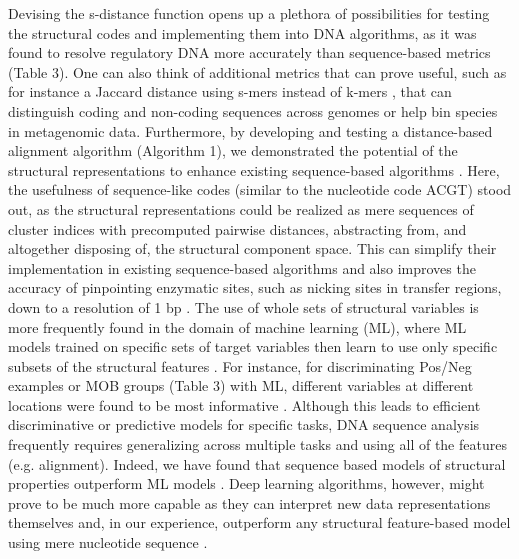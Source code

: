 \documentclass[sigconf]{acmart}
\begin{document}
Devising the s-distance function opens up a plethora of possibilities for testing the structural codes and implementing them into DNA algorithms, as it was found to resolve regulatory DNA more accurately than sequence-based metrics \cite{Zrimec2020-wx,Zrimec2018-lx} (Table 3). One can also think of additional metrics that can prove useful, such as for instance a Jaccard distance using s-mers instead of k-mers \cite{Zrimec2020-wx}, that can distinguish coding and non-coding sequences across genomes or help bin species in metagenomic data. Furthermore, by developing and testing a distance-based alignment algorithm (Algorithm 1), we demonstrated the potential of the structural representations to enhance existing sequence-based algorithms \cite{Zrimec2020-wx}. Here, the usefulness of sequence-like codes (similar to the nucleotide code ACGT) stood out, as the structural representations could be realized as mere sequences of cluster indices with precomputed pairwise distances, abstracting from, and altogether disposing of, the structural component space. This can simplify their implementation in existing sequence-based algorithms and also improves the accuracy of pinpointing enzymatic sites, such as nicking sites in transfer regions, down to a resolution of 1 bp \cite{Zrimec2020-wx}. The use of whole sets of structural variables is more frequently found in the domain of machine learning (ML), where ML models trained on specific sets of target variables then learn to use only specific subsets of the structural features \cite{Zrimec2015-xf,Zrimec2018-lx,Zrimec2013-ds}. For instance, for discriminating Pos/Neg examples or MOB groups (Table 3) with ML, different variables at different locations were found to be most informative \cite{Zrimec2020-wx,Zrimec2018-lx}. Although this leads to efficient discriminative or predictive models for specific tasks, DNA sequence analysis frequently requires generalizing across multiple tasks and using all of the features (e.g. alignment). Indeed, we have found that sequence based models of structural properties outperform ML models \cite{Zrimec2020-wx,Zrimec2018-lx}. Deep learning algorithms, however, might prove to be much more capable as they can interpret new data representations themselves \cite{Bengio2013-xg} and, in our experience, outperform any structural feature-based model using mere nucleotide sequence \cite{Zrimec2019-ql}.
\end{document}
